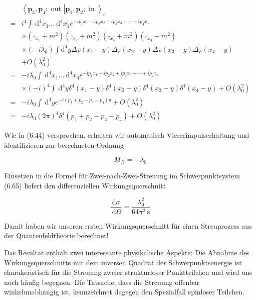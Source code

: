 \documentclass[10pt, letterpaper]{article}
\begin{document}
$$
\begin{aligned}
& \left.\left\langle\mathbf{p}_{3}, \mathbf{p}_{4} ; \text { out }\right| \mathbf{p}_{1}, \mathbf{p}_{2} ; \text { in }\right\rangle_{c} \\
= & i^{4} \int \mathrm{~d}^{4} x_{1} \ldots \mathrm{~d}^{4} x_{4} e^{-i p_{1} x_{1}-i p_{2} x_{2}+i p_{3} x_{3}+\cdots+i p_{4} x_{4}} \\
& \times\left(\square_{x_{1}}+m^{2}\right)\left(\square_{x_{2}}+m^{2}\right)\left(\square_{x_{3}}+m^{2}\right)\left(\square_{x_{4}}+m^{2}\right) \\
& \times\left(-i \lambda_{0}\right) \int \mathrm{d}^{4} y \Delta_{F}\left(x_{1}-y\right) \Delta_{F}\left(x_{2}-y\right) \Delta_{F}\left(x_{3}-y\right) \Delta_{F}\left(x_{4}-y\right) \\
& +O\left(\lambda_{0}^{2}\right) \\
= & -i \lambda_{0} \int \mathrm{~d}^{4} x_{1} \ldots \mathrm{~d}^{4} x_{4} e^{-i p_{1} x_{1}-i p_{2} x_{2}+i p_{3} x_{3}+\cdots+i p_{4} x_{4}} \\
& \times(-i)^{4} \int \mathrm{~d}^{4} y \delta^{4}\left(x_{1}-y\right) \delta^{4}\left(x_{2}-y\right) \delta^{4}\left(x_{3}-y\right) \delta^{4}\left(x_{4}-y\right)+O\left(\lambda_{0}^{2}\right) \\
= & -i \lambda_{0} \int \mathrm{~d}^{4} y e^{-i\left(p_{1}+p_{2}-p_{3}-p_{4}\right) y}+O\left(\lambda_{0}^{2}\right) \\
= & -i \lambda_{0}(2 \pi)^{4} \delta^{4}\left(p_{1}+p_{2}-p_{3}-p_{4}\right)+O\left(\lambda_{0}^{2}\right)
\end{aligned}
$$

Wie in (6.44) versprochen, erhalten wir automatisch Viererimpulserhaltung und identifizieren zur berechneten Ordnung

$$
M_{f i}=-\lambda_{0}
$$

Einsetzen in die Formel für Zwei-nach-Zwei-Streuung im Schwerpunktsystem (6.65) liefert den differenziellen Wirkungsquerschnitt

$$
\frac{\mathrm{d} \sigma}{\mathrm{~d} \Omega}=\frac{\lambda_{0}^{2}}{64 \pi^{2} \mathrm{~s}}
$$

Damit haben wir unseren ersten Wirkungsquerschnitt für einen Streuprozess aus der Quantenfeldtheorie berechnet!

Das Resultat enthält zwei interessante physikalische Aspekte: Die Abnahme des Wirkungsquerschnitts mit dem inversen Quadrat der Schwerpunktsenergie ist charakeristisch für die Streuung zweier strukturloser Punktteilchen und wird uns noch häufig begegnen. Die Tatsache, dass die Streuung offenbar winkelunabhängig ist, kennzeichnet dagegen den Spezialfall spinloser Teilchen.
\end{document}
